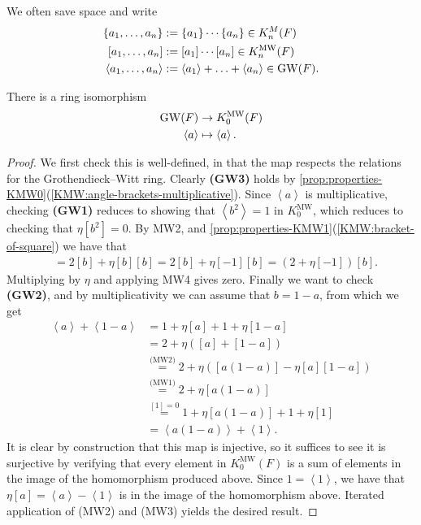 \documentclass[11pt,openany]{book}
\providecommand{\MW}{\mathrm{MW}}
\begin{document}
\begin{notation} We often save space and write
\begin{align*}
    \left\{ a_1, \ldots, a_n \right\} &:= \left\{ a_1 \right\}\cdots \left\{ a_n \right\}\in K_n^M(F) \\
    \left[ a_1, \ldots, a_n \right] &:= \left[ a_1 \right]\cdots \left[ a_n \right]\in K_n^\MW(F) \\
    \left\langle a_1, \ldots, a_n \right\rangle &:= \left\langle a_1 \right\rangle + \ldots + \left\langle a_n \right\rangle\in \GW(F).
\end{align*}
\end{notation}

\begin{proposition} There is a ring isomorphism
\begin{align*}
    \GW(F) &\to K_0^\MW(F) \\
    \left\langle a \right\rangle &\mapsto \left\langle a \right\rangle.
\end{align*}
\end{proposition}
\begin{proof} We first check this is well-defined, in that the map respects the relations for the Grothendieck--Witt ring. Clearly \textbf{(GW3)} holds by \autoref{prop:properties-KMW0}(\ref{KMW:angle-brackets-multiplicative}). Since $\left\langle a \right\rangle$ is multiplicative, checking \textbf{(GW1)} reduces to showing that $\left\langle b^2 \right\rangle = 1$ in $K_0^\MW$, which reduces to checking that $\eta[b^2] = 0$.
By MW2, and \autoref{prop:properties-KMW1}(\ref{KMW:bracket-of-square}) we have that
\begin{align*}
    [b^2] &=  2[b] + \eta[b][b] = 2[b] + \eta[-1][b] = (2 + \eta[-1])[b].
\end{align*}
Multiplying by $\eta$ and applying MW4 gives zero. Finally we want to check \textbf{(GW2)}, and by multiplicativity we can assume that $b = 1-a$, from which we get
\begin{align*}
    \left\langle a \right\rangle + \left\langle 1-a \right\rangle &= 1 + \eta[a] + 1 + \eta[1-a] \\
    &= 2 + \eta \left( [a] + [1-a] \right) \\
    &\overset{\text{(MW2)}}{=} 2 + \eta \left( [a(1-a)] - \eta[a][1-a] \right) \\
    &\overset{\text{(MW1)}}{=} 2 + \eta[a(1-a)] \\
    &\overset{[1]=0}{=} 1 + \eta[a(1-a)] + 1 + \eta[1] \\
    &= \left\langle a(1-a) \right\rangle + \left\langle 1 \right\rangle.
\end{align*}
%
It is clear by construction that this map is injective, so it suffices to see it is surjective by verifying that every element in $K_0^\MW(F)$ is a sum of elements in the image of the homomorphism produced above. Since $1 = \left\langle 1 \right\rangle$, we have that $\eta[a] = \left\langle a \right\rangle - \left\langle 1 \right\rangle$ is in the image of the homomorphism above. Iterated application of (MW2) and (MW3) yields the desired result.
\end{proof}
\end{document}
